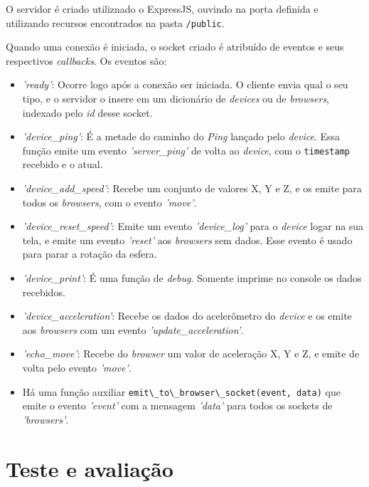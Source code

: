 \documentclass[a4paper,12pt]{article}
\newcommand{\code}[1]{\lstinline[mathescape=true, columns=fixed, basicstyle={\small\ttfamily}]{#1}}
\begin{document}
O servidor é criado utiliznado o ExpressJS, ouvindo na porta definida e utilizando recursos encontrados na pasta \code{/public}.

Quando uma conexão é iniciada, o socket criado é atribuído de eventos e seus respectivos \emph{callbacks}. Os eventos são:

\begin{itemize}

    \item \emph{'ready'}: Ocorre logo após a conexão ser iniciada. O cliente envia qual o seu tipo, e o servidor o insere em um dicionário de \emph{devices} ou de \emph{browsers}, indexado pelo \emph{id} desse socket.

    \item \emph{'device\_ping'}: É a metade do caminho do \emph{Ping} lançado pelo \emph{device}. Essa função emite um evento \emph{'server\_ping'} de volta ao \emph{device}, com o \code{timestamp} recebido e o atual.

    \item \emph{'device\_add\_speed'}: Recebe um conjunto de valores X, Y e Z, e os emite para todos os \emph{browsers}, com o evento \emph{'move'}.

    \item \emph{'device\_reset\_speed'}: Emite um evento \emph{'device\_log'} para o \emph{device} logar na sua tela, e emite um evento \emph{'reset'} aos \emph{browsers} sem dados. Esse evento é usado para parar a rotação da esfera.

    \item \emph{'device\_print'}: É uma função de \emph{debug}. Somente imprime no console os dados recebidos.

    \item \emph{'device\_acceleration'}: Recebe os dados do acelerômetro do \emph{device} e os emite aos \emph{browsers} com um evento \emph{'update\_acceleration'}.

    \item \emph{'echo\_move'}: Recebe do \emph{browser} um valor de aceleração X, Y e Z, e emite de volta pelo evento \emph{'move'}.

    \item Há uma função auxiliar \code{emit\_to\_browser\_socket(event, data)} que emite o evento \emph{'event'} com a mensagem \emph{'data'} para todos os sockets de \emph{'browsers'}.

\end{itemize}


\newpage
\section{Teste e avaliação}
\end{document}
